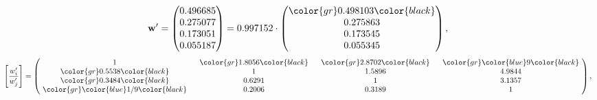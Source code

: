 \begin{example}
\begin{equation*}
\mathbf{w}^{\prime} =
\begin{pmatrix}
0.496685\\
0.275077\\
0.173051\\
0.055187
\end{pmatrix} =
0.997152\cdot
\begin{pmatrix}
\color{gr} 0.498103\color{black} \\
0.275863\\
0.173545\\
0.055345
\end{pmatrix},
\end{equation*}
\begin{equation*}
\left[ \frac{{w}^{\prime}_i}{{w}^{\prime}_j} \right] =
\begin{pmatrix}
$\,\,$ 1 $\,\,$ & $\,\,$\color{gr} 1.8056\color{black} $\,\,$ & $\,\,$\color{gr} 2.8702\color{black} $\,\,$ & $\,\,$\color{gr} \color{blue} 9\color{black} $\,\,$ \\
$\,\,$\color{gr} 0.5538\color{black} $\,\,$ & $\,\,$ 1 $\,\,$ & $\,\,$1.5896$\,\,$ & $\,\,$4.9844  $\,\,$ \\
$\,\,$\color{gr} 0.3484\color{black} $\,\,$ & $\,\,$0.6291$\,\,$ & $\,\,$ 1 $\,\,$ & $\,\,$3.1357 $\,\,$ \\
$\,\,$\color{gr} \color{blue}  1/9\color{black} $\,\,$ & $\,\,$0.2006$\,\,$ & $\,\,$0.3189$\,\,$ & $\,\,$ 1  $\,\,$ \\
\end{pmatrix},
\end{equation*}
\end{example}
\newpage
